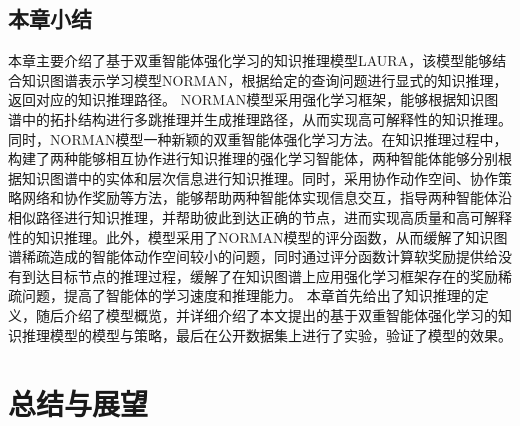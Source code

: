 \documentclass[algorithmlist, AutoFakeBold, AutoFakeSlant, figurelist, tablelist, nomlist, engineering, openany]{seuthesix} %
\begin{document}
\section{本章小结}
本章主要介绍了基于双重智能体强化学习的知识推理模型LAURA，该模型能够结合知识图谱表示学习模型NORMAN，根据给定的查询问题进行显式的知识推理，返回对应的知识推理路径。
NORMAN模型采用强化学习框架，能够根据知识图谱中的拓扑结构进行多跳推理并生成推理路径，从而实现高可解释性的知识推理。同时，NORMAN模型一种新颖的双重智能体强化学习方法。在知识推理过程中，构建了两种能够相互协作进行知识推理的强化学习智能体，两种智能体能够分别根据知识图谱中的实体和层次信息进行知识推理。同时，采用协作动作空间、协作策略网络和协作奖励等方法，能够帮助两种智能体实现信息交互，指导两种智能体沿相似路径进行知识推理，并帮助彼此到达正确的节点，进而实现高质量和高可解释性的知识推理。此外，模型采用了NORMAN模型的评分函数，从而缓解了知识图谱稀疏造成的智能体动作空间较小的问题，同时通过评分函数计算软奖励提供给没有到达目标节点的推理过程，缓解了在知识图谱上应用强化学习框架存在的奖励稀疏问题，提高了智能体的学习速度和推理能力。
本章首先给出了知识推理的定义，随后介绍了模型概览，并详细介绍了本文提出的基于双重智能体强化学习的知识推理模型的模型与策略，最后在公开数据集上进行了实验，验证了模型的效果。


\chapter{总结与展望}
\end{document}
